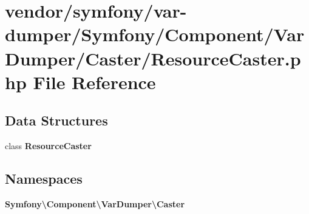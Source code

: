 \section{vendor/symfony/var-\/dumper/\+Symfony/\+Component/\+Var\+Dumper/\+Caster/\+Resource\+Caster.php File Reference}
\label{_resource_caster_8php}
\subsection*{Data Structures}
\begin{DoxyCompactItemize}
\item 
class {\bf Resource\+Caster}
\end{DoxyCompactItemize}
\subsection*{Namespaces}
\begin{DoxyCompactItemize}
\item 
 {\bf Symfony\textbackslash{}\+Component\textbackslash{}\+Var\+Dumper\textbackslash{}\+Caster}
\end{DoxyCompactItemize}
